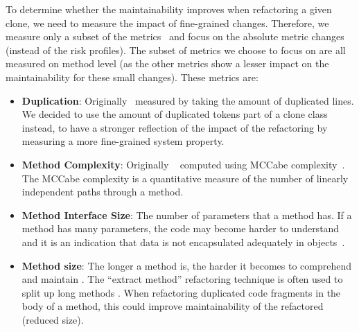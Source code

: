 \documentclass[a4paper,UKenglish,cleveref, autoref, thm-restate,authorcolumns]{lipics-v2019}
\begin{document}
To determine whether the maintainability improves when refactoring a given clone, we need to measure the impact of fine-grained changes. Therefore, we measure only a subset of the metrics~\cite{heitlager2007practical} and focus on the absolute metric changes (instead of the risk profiles). The subset of metrics we choose to focus on are all measured on method level (as the other metrics show a lesser impact on the maintainability for these small changes). These metrics are:
\begin{itemize}
\item \textbf{Duplication}: Originally~\cite{heitlager2007practical} measured by taking the amount of duplicated lines. We decided to use the amount of duplicated tokens part of a clone class instead, to have a stronger reflection of the impact of the refactoring by measuring a more fine-grained system property.
\item \textbf{Method Complexity}:  Originally ~\cite{heitlager2007practical} computed using MCCabe complexity~\cite{mccabe1976complexity}. The MCCabe complexity is a quantitative measure of the number of linearly independent paths through a method.%
\item \textbf{Method Interface Size}: The number of parameters that a method has. If a method has many parameters, the code may become harder to understand and it is an indication that data is not encapsulated adequately in objects~\cite{fowler2018refactoring}.
\item \textbf{Method size}: The longer a method is, the harder it becomes to comprehend and maintain \cite{heitlager2007practical}. The ``extract method'' refactoring technique is often used to split up long methods \cite{charalampidou2018structural}. When refactoring duplicated code fragments in the body of a method, this could improve maintainability of the refactored (reduced size).
\end{itemize}
\end{document}
